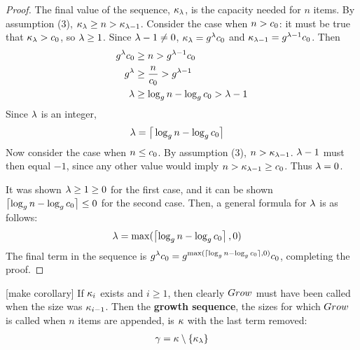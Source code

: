 \begin{proof}
	The final value of the sequence, $\kappa_\lambda$, is the capacity needed for $n$ items. By assumption (3), $\kappa_\lambda \geq n > \kappa_{\lambda - 1}$. Consider the case when $n > c_0$: it must be true that $\kappa_\lambda > c_0$, so $\lambda \geq 1$. Since $\lambda - 1 \neq 0$, $\kappa_\lambda = g^\lambda c_0$ and $\kappa_{\lambda - 1} = g^{\lambda - 1}c_0$. Then
	\begin{align*}
	g^\lambda c_0 &\geq n > g^{\lambda - 1}c_0\\
	g^\lambda &\geq \frac{n}{c_0} > g^{\lambda - 1}\\
	\lambda &\geq \log_{g} n - \log_{g} c_0 > \lambda - 1\\
	\end{align*}
	Since $\lambda$ is an integer,
	\begin{align*}
	\lambda &= \big\lceil \log_{g} n - \log_{g} c_0 \big\rceil
	\end{align*}
	Now consider the case when $n \leq c_0$. By assumption (3), $n > \kappa_{\lambda - 1}$. $\lambda - 1$ must then equal $-1$, since any other value would imply $n > \kappa_{\lambda - 1} \geq c_0$. Thus $\lambda = 0$.
	
	It was shown $\lambda \geq 1 \geq 0$ for the first case, and it can be shown $\left\lceil \log_{g} n - \log_{g} c_0 \right\rceil \leq 0$ for the second case. Then, a general formula for $\lambda$ is as follows:
	\begin{align*}
	\lambda &= \max(\left\lceil \log_{g} n - \log_{g} c_0 \right\rceil, 0)
	\end{align*}
	The final term in the sequence is $g^\lambda c_0 = g^{\max(\lceil \log_{g} n - \log_{g} c_0 \rceil, 0)}c_0$, completing the proof.
\end{proof}

[make corollary]
If $\kappa_i$ exists and $i \geq 1$, then clearly $Grow$ must have been called when the size was $\kappa_{i - 1}$. Then the \textbf{growth sequence}, the sizes for which $Grow$ is called when $n$ items are appended, is $\kappa$ with the last term removed:
\begin{align*}
\gamma = \kappa \setminus \left\{ \kappa_\lambda \right\}
\end{align*}

